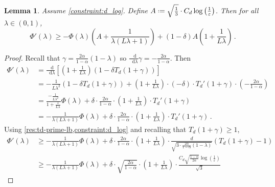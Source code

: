 \documentclass[10pt,a4paper]{article}
\newtheorem{lemma}{Lemma}[section]
\newcommand{\odif}{\mathop{}\!\mathrm{d}} %
\newcommand*{\define}{\mathrel{\vcenter{\baselineskip0.5ex \lineskiplimit0pt
                      \hbox{\scriptsize.}\hbox{\scriptsize.}}}%
                      =}
\renewcommand{\epsilon}{\varepsilon}
\begin{document}
\begin{lemma}
    \label{res:phi-differential-ineq}
    Assume \cref{constraint:d_log}. Define $A \define \sqrt{\tfrac{1}{3}} \cdot C_d
\log\left(\tfrac{1}{\epsilon}\right)$. Then for all $\lambda \in (0, 1)$,
    \[
        \Phi'(\lambda)
        \ge -\Phi(\lambda)
            \left( A + \frac{1}{\lambda (L\lambda + 1)} \right)
            + (1-\delta)A \left( 1 + \frac{1}{L\lambda} \right) \,.
    \]
\end{lemma}
\begin{proof}
    Recall that $\gamma = \frac{2\alpha}{1-\alpha}(1-\lambda)$ so $\tfrac{\odif}{\odif
\lambda}\gamma = -\frac{2\alpha}{1-\alpha}$. Then
    \begin{align*}
        \Phi'(\lambda) 
        &= \frac{\odif}{\odif \lambda} \left[
            \left(1 + \frac{1}{L \lambda}\right)
            \left(1 - \delta T_d\left(1 + \gamma\right)\right)
        \right] \\
        &= -\frac{1}{L \lambda^2}
                \left(1 - \delta T_d\left(1 + \gamma \right)\right)
            + \left(1 + \frac{1}{L \lambda}\right) \cdot (-\delta) \cdot
                T_d'\left(1 + \gamma \right) \cdot
                \left( -\frac{2\alpha}{1-\alpha} \right) \\
        &= \frac{-\frac{1}{L \lambda^2}}{1 + \frac{1}{L\lambda}} \Phi(\lambda)
            + \delta \cdot \frac{2\alpha}{1-\alpha} \cdot
            \left(1 + \frac{1}{L \lambda}\right) \cdot T_d'(1+\gamma) \\
        &= -\frac{1}{\lambda (L\lambda+1)} \Phi(\lambda)
            + \delta \cdot \frac{2\alpha}{1-\alpha} \cdot
            \left(1 + \frac{1}{L \lambda}\right) \cdot T_d'(1+\gamma) \,.
    \end{align*}
    Using \cref{res:td-prime-lb,constraint:d_log} and recalling that $T_d(1+\gamma) \ge 1$,
    \begin{align*}
        \Phi'(\lambda)
        &\ge -\frac{1}{\lambda (L\lambda+1)} \Phi(\lambda)
            + \delta \cdot \frac{2\alpha}{1-\alpha} \cdot
            \left(1 + \frac{1}{L \lambda}\right) \cdot
                \frac{d}{\sqrt{3 \cdot \frac{2\alpha}{1-\alpha}(1-\lambda)}}
                \left(T_d(1+\gamma) - 1\right) \\
        &\ge -\frac{1}{\lambda (L\lambda+1)} \Phi(\lambda)
            + \delta \cdot \sqrt{\frac{2\alpha}{1-\alpha}} \cdot
            \left(1 + \frac{1}{L \lambda}\right) \cdot
                \frac{C_d \sqrt{\frac{1-\alpha}{2\alpha}} \log \left(\frac{1}{\epsilon} \right)}{\sqrt{3}}

\end{align*}
\end{proof}
\end{document}
